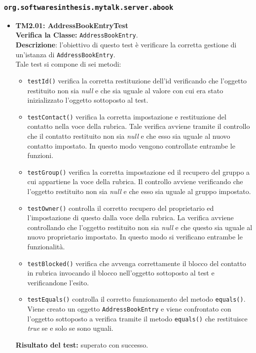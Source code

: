 \subsubsection{\texttt{org.softwaresinthesis.mytalk.server.abook}}
\begin{itemize}
\item \textbf{TM2.01: AddressBookEntryTest}\\
\textbf{Verifica la Classe:} \texttt{AddressBookEntry}.\\
\textbf{Descrizione}: l'obiettivo di questo test è verificare la corretta gestione di un'istanza di \texttt{AddressBookEntry}.\\
Tale test si compone di sei metodi:
\begin{itemize}

\item \texttt{testId()} verifica la corretta restituzione dell'id verificando che l'oggetto restituito non sia \textit{null} e che sia uguale al valore con cui era stato inizializzato l'oggetto sottoposto al test.

\item \texttt{testContact()} verifica la corretta impostazione e restituzione del contatto nella voce della rubrica. Tale verifica avviene tramite il controllo che il contatto restituito non sia \textit{null} e che esso sia uguale al nuovo contatto impostato. In questo modo vengono controllate entrambe le funzioni.

\item \texttt{testGroup()} verifica la corretta impostazione ed il recupero del gruppo a cui appartiene la voce della rubrica. Il controllo avviene verificando che l'oggetto restituito non sia \textit{null} e che esso sia uguale al gruppo impostato. 

\item \texttt{testOwner()} controlla il corretto recupero del proprietario ed l'impostazione di questo dalla voce della rubrica. La verifica avviene controllando che l'oggetto restituito non sia \textit{null} e che questo sia uguale al nuovo proprietario impostato. In questo modo si verificano entrambe le funzionalità.

\item \texttt{testBlocked()} verifica che avvenga correttamente il blocco del contatto in rubrica invocando il blocco nell'oggetto sottoposto al test e verificandone l'esito.

\item\texttt{testEquals()} controlla  il corretto funzionamento del metodo \texttt{equals()}. Viene creato un oggetto \texttt{AddressBookEntry} e viene confrontato con l'oggetto sottoposto a verifica tramite il metodo \texttt{equals()} che restituisce \textit{true} se e solo se sono uguali.
\end{itemize}
\textbf{Risultato del test:} superato con successo.


\end{itemize}
